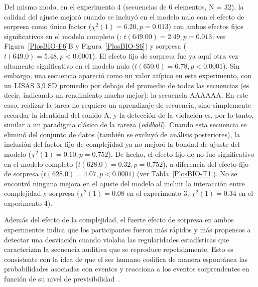 Del mismo modo, en el experimento 4 (secuencias de 6 elementos, N = 32), la calidad del ajuste mejoró cuando \mdlbin se incluyó en el modelo nulo con el efecto de sorpresa como único factor ($\chi^2(1) = 6.20, p= 0.013$) con ambos efectos fijos significativos en el modelo completo (\mdlbin: $t (649.00) = 2.49, p= 0.013$; ver Figura~\ref{PlosBIO-F6}B y Figura~\ref{PlosBIO-S6}) y sorpresa ($t (649.0) = 5.48, p < 0.0001$). El efecto fijo de sorpresa fue ya aquí otra vez altamente significativo en el modelo nulo ($t (650.0) = 6.78, p < 0.0001$). Sin embargo, una secuencia apareció como un valor atípico en este experimento, con un LISAS 3,9 SD promedio por debajo del promedio de todas las secuencias (es decir, indicando un rendimiento mucho mejor): la secuencia AAAAAA. En este caso, realizar la tarea no requiere un aprendizaje de secuencia, sino simplemente recordar la identidad del sonido A, y la detección de la violación es, por lo tanto, similar a un paradigma clásico de la  rareza (\textit{oddball}). Cuando esta secuencia se eliminó del conjunto de datos (también se excluyó de análisis posteriores), la inclusión del factor fijo de complejidad ya no mejoró la bondad de ajuste del modelo ($\chi^2 (1) = 0.10, p = 0.752$). De hecho, el efecto fijo de \mdlbin no fue significativo en el modelo completo ($t (628.0) = 0.32, p = 0.752$), a diferencia del efecto fijo de sorpresa ($t (628.0) = 4.07, p < 0.0001$) (ver Tabla~\ref{PlosBIO-T1}). No se encontró ninguna mejora en el ajuste del modelo al incluir la interacción entre complejidad y sorpresa ($\chi^2(1) = 0.08$ en el experimento 3, $\chi^2(1) = 0.34$ en el experimento 4).


Además del efecto de la complejidad, el fuerte efecto de sorpresa en ambos experimentos indica que los participantes fueron más rápidos y más propensos a detectar una desviación cuando violaba las regularidades estadísticas que caracterizan la secuencia auditiva que se reproduce repetidamente. Esto es consistente con la idea de que el ser humano codifica de manera espontánea las probabilidades asociadas con eventos y reacciona a los eventos sorprendentes en función de su nivel de previsibilidad~\cite{f19,f22}.

